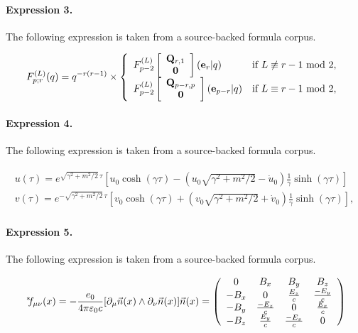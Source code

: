 \documentclass[11pt]{article}
\begin{document}
\paragraph{Expression 3.} The following expression is taken from a source-backed formula corpus.

\begin{align*}F^{(L)}_{p;r}(q) =q^{-r(r-1)} \times\left\{ \begin{array}{ll}F^{(L)}_{p-2} \left[ \begin{array}{c}{\bf Q}_{r,1} \\ {\bf 0} \end{array} \right]({\bf e}_r | q) &\mbox {if $L \not\equiv r-1$ mod $2$}, \\F^{(L)}_{p-2} \left[ \begin{array}{c}{\bf Q}_{p-r,p} \\ {\bf 0} \end{array} \right]({\bf e}_{p-r} | q) &\text{if $L \equiv r-1$ mod $2$},\end{array}\right.\end{align*}

\paragraph{Expression 4.} The following expression is taken from a source-backed formula corpus.

\begin{align*}\begin{array}{c}u(\tau )=e^{\sqrt{\gamma ^2+m^2/2}\,\tau }\left[ u_0\cosh (\gamma \tau)-\left( u_0\sqrt{\gamma ^2+m^2/2}-\dot u_0\right) \frac 1\gamma \sinh(\gamma \tau )\right] \\v(\tau )=e^{-\sqrt{\gamma ^2+m^2/2}\,\tau }\left[ v_0\cosh (\gamma \tau)+\left( v_0\sqrt{\gamma ^2+m^2/2}+\dot v_0\right) \frac 1\gamma \sinh(\gamma \tau )\right] ,\end{array}\end{align*}

\paragraph{Expression 5.} The following expression is taken from a source-backed formula corpus.

\begin{align*}{\hspace{1mm}^*}\hspace{-1mm}f_{\mu \nu}(x) = - \frac{e_0}{4 \pi \varepsilon_0 c} [ \partial_\mu \vec{n}(x) \wedge \partial_\nu \vec{n}(x) ] \vec{n}(x)=\left( \begin{array}{cccc} 0 & B_x & B_y & B_z \\ -B_x & 0 & \frac{E_z}{c} & \frac{-E_y}{c} \\ -B_y & \frac{-E_z}{c} & 0 & \frac{E_x}{c} \\ -B_z & \frac{E_y}{c} & \frac{-E_x}{c} & 0 \\\end{array} \right)\end{align*}
\end{document}

